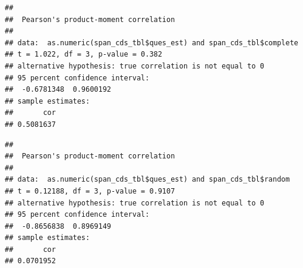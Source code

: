 \documentclass[
]{article}
\newenvironment{Shaded}{\begin{snugshade}}{\end{snugshade}}
\newcommand{\KeywordTok}[1]{\textcolor[rgb]{0.13,0.29,0.53}{\textbf{#1}}}
\newcommand{\NormalTok}[1]{#1}
\newcommand{\OperatorTok}[1]{\textcolor[rgb]{0.81,0.36,0.00}{\textbf{#1}}}
\begin{document}
\begin{verbatim}
## 
##  Pearson's product-moment correlation
## 
## data:  as.numeric(span_cds_tbl$ques_est) and span_cds_tbl$complete
## t = 1.022, df = 3, p-value = 0.382
## alternative hypothesis: true correlation is not equal to 0
## 95 percent confidence interval:
##  -0.6781348  0.9600192
## sample estimates:
##       cor 
## 0.5081637
\end{verbatim}

\begin{Shaded}
\end{Shaded}

\begin{verbatim}
## 
##  Pearson's product-moment correlation
## 
## data:  as.numeric(span_cds_tbl$ques_est) and span_cds_tbl$random
## t = 0.12188, df = 3, p-value = 0.9107
## alternative hypothesis: true correlation is not equal to 0
## 95 percent confidence interval:
##  -0.8656838  0.8969149
## sample estimates:
##       cor 
## 0.0701952
\end{verbatim}
\end{document}
